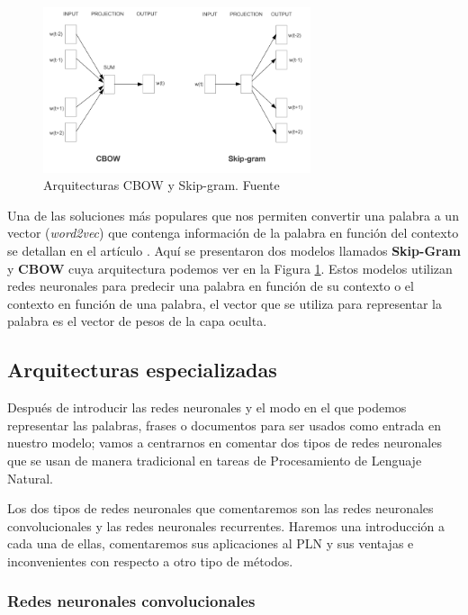 \begin{figure}[!ht]
	\centering
	\includegraphics[width=0.7\textwidth]{images/arte/word2vec}
	\caption{Arquitecturas CBOW y Skip-gram. Fuente \cite{word2vec}}
	\label{fig:wor2vec}
\end{figure}

Una de las soluciones más populares que nos permiten convertir una palabra a un vector (\textit{word2vec}) que contenga información de la palabra en función del contexto se detallan en el artículo \cite{word2vec} . Aquí se presentaron dos modelos llamados \textbf{Skip-Gram} y \textbf{CBOW} cuya arquitectura podemos ver en la Figura \ref{fig:wor2vec}. Estos modelos utilizan redes neuronales para predecir una palabra en función de su contexto o el contexto en función de una palabra, el vector que se utiliza para representar la palabra es el vector de pesos de la capa oculta. 



\subsection{Arquitecturas especializadas}

Después de introducir las redes neuronales y el modo en el que podemos representar las palabras, frases o documentos para ser usados como entrada en nuestro modelo; vamos a centrarnos en comentar dos tipos de redes neuronales que se usan de manera tradicional en tareas de Procesamiento de Lenguaje Natural. 

Los dos tipos de redes neuronales que comentaremos son las redes neuronales convolucionales y las redes neuronales recurrentes. Haremos una introducción a cada una de ellas, comentaremos sus aplicaciones al PLN y sus ventajas e inconvenientes con respecto a otro tipo de métodos. 


\subsubsection{Redes neuronales convolucionales}
\label{section:arte:arqu:cnn}


